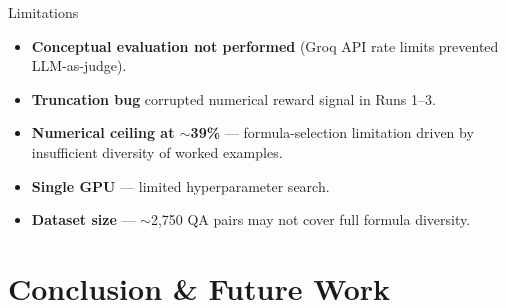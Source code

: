 \documentclass[10pt]{beamer}
\begin{document}
\begin{frame}{Limitations}
\large
\begin{itemize}
    \item \textbf{Conceptual evaluation not performed} (Groq API rate limits prevented LLM-as-judge).
    \vspace{0.2cm}
    \item \textbf{Truncation bug} corrupted numerical reward signal in Runs 1--3.
    \vspace{0.2cm}
    \item \textbf{Numerical ceiling at $\sim$39\%} — formula-selection limitation driven by insufficient diversity of worked examples.
    \vspace{0.2cm}
    \item \textbf{Single GPU} — limited hyperparameter search.
    \vspace{0.2cm}
    \item \textbf{Dataset size} — $\sim$2,750 QA pairs may not cover full formula diversity.
\end{itemize}
\end{frame}

\section{Conclusion \& Future Work}
\end{document}
